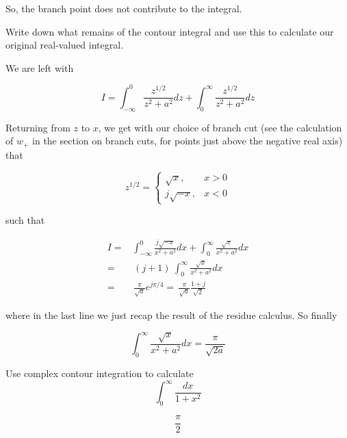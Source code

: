 So, the branch point does not contribute to the integral.

\begin{cue}
Write down what remains of the contour integral and use this to calculate our original real-valued integral.
\end{cue}

We are left with

\begin{equation}
I = \int_{- \infty}^{0}\frac{z^{1/2}}{z^2+a^2}dz + \int_{0}^{\infty}\frac{z^{1/2}}{z^2+a^2}dz
\end{equation} 

Returning from $z$ to $x$, we get with our choice of branch cut (see the calculation of $w_+$ in the section on branch cuts, for points just above the negative real axis) that

\begin{equation}
z^{1/2} = 
\begin{cases}
\sqrt{x}, & x > 0\\
j \sqrt{-x}, & x < 0
\end{cases}
\end{equation} 

such that

\begin{align}
I = & \int_{- \infty}^{0}\frac{j\sqrt{-x}}{x^2+a^2}dx +
\int_{0}^{\infty}\frac{\sqrt{x}}{x^2+a^2}dx \nonumber \\
 = & \, (j + 1) \ \int_{0}^{\infty}\frac{\sqrt{x}}{x^2+a^2}dx \nonumber \\
 = & \, \frac{\pi}{\sqrt{a}} e^{j \pi /4} = \, \frac{\pi}{\sqrt{a}} \frac{1+j}{\sqrt{2}}
\end{align} 

where in the last line we just recap the result of the residue calculus. So finally

\begin{equation}
\int_0^{\infty}\frac{\sqrt{x}}{x^2+a^2}dx = \frac{\pi}{\sqrt{2a}}
\end{equation}

\pagebreak

\begin{exer}
  \label{ex-contour-integral-1}
Use complex contour integration to calculate
$$\int_0^{\infty} \frac{dx}{1+x^2}$$
\begin{sol}
$$\frac{\pi}{2}$$
\end{sol}
\end{exer}

